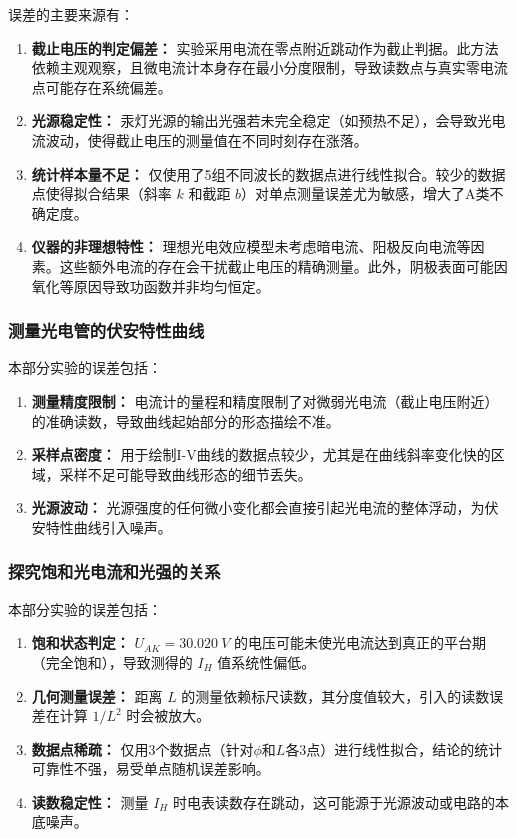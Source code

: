 \documentclass{../../templates/Report}%
\begin{document}
\begin{fullreportonly}
误差的主要来源有：
\begin{enumerate}
    \item \textbf{截止电压的判定偏差：} 实验采用电流在零点附近跳动作为截止判据。此方法依赖主观观察，且微电流计本身存在最小分度限制，导致读数点与真实零电流点可能存在系统偏差。
    \item \textbf{光源稳定性：} 汞灯光源的输出光强若未完全稳定（如预热不足），会导致光电流波动，使得截止电压的测量值在不同时刻存在涨落。
    \item \textbf{统计样本量不足：} 仅使用了5组不同波长的数据点进行线性拟合。较少的数据点使得拟合结果（斜率 $k$ 和截距 $b$）对单点测量误差尤为敏感，增大了A类不确定度。
    \item \textbf{仪器的非理想特性：} 理想光电效应模型未考虑暗电流、阳极反向电流等因素。这些额外电流的存在会干扰截止电压的精确测量。此外，阴极表面可能因氧化等原因导致功函数并非均匀恒定。
\end{enumerate}

\subsubsection{测量光电管的伏安特性曲线}
本部分实验的误差包括：
\begin{enumerate}
    \item \textbf{测量精度限制：} 电流计的量程和精度限制了对微弱光电流（截止电压附近）的准确读数，导致曲线起始部分的形态描绘不准。
    \item \textbf{采样点密度：} 用于绘制I-V曲线的数据点较少，尤其是在曲线斜率变化快的区域，采样不足可能导致曲线形态的细节丢失。
    \item \textbf{光源波动：} 光源强度的任何微小变化都会直接引起光电流的整体浮动，为伏安特性曲线引入噪声。
\end{enumerate}

\subsubsection{探究饱和光电流和光强的关系}
本部分实验的误差包括：
\begin{enumerate}
    \item \textbf{饱和状态判定：} $U_{AK} = \SI{30.020}{V}$ 的电压可能未使光电流达到真正的平台期（完全饱和），导致测得的 $I_H$ 值系统性偏低。
    \item \textbf{几何测量误差：} 距离 $L$ 的测量依赖标尺读数，其分度值较大，引入的读数误差在计算 $1/L^2$ 时会被放大。
    \item \textbf{数据点稀疏：} 仅用3个数据点（针对$\phi$和$L$各3点）进行线性拟合，结论的统计可靠性不强，易受单点随机误差影响。
    \item \textbf{读数稳定性：} 测量 $I_H$ 时电表读数存在跳动，这可能源于光源波动或电路的本底噪声。
\end{enumerate}


\end{fullreportonly}
\end{document}
